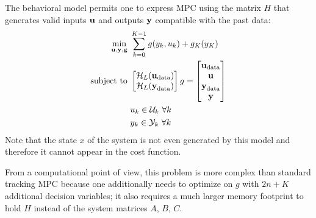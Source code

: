 The behavioral model permits one to express MPC using the matrix $H$ that generates valid inputs $\boldsymbol{\mathrm{u}}$ and outputs $\boldsymbol{\mathrm{y}}$ compatible with the past data:
\begin{equation*}
  \begin{aligned}
    \min_{\boldsymbol{\mathrm{u}}, \boldsymbol{\mathrm{y}},\boldsymbol{\mathrm{g}}}\ & \sum_{k=0}^{K-1} g(y_k,u_k) + g_K(y_K) \\
    \textrm{subject to } & \begin{bmatrix}
                             \mathcal{H}_L(\boldsymbol{\mathrm{u}}_\textrm{data}) \\ \mathcal{H}_L(\boldsymbol{\mathrm{y}}_\textrm{data})
                           \end{bmatrix} g =
                           \begin{bmatrix}
                             \boldsymbol{\mathrm{u}}_\textrm{data} \\ \boldsymbol{\mathrm{u}} \\ \boldsymbol{\mathrm{y}}_\textrm{data} \\ \boldsymbol{\mathrm{y}}
                           \end{bmatrix} \\
                           & u_k \in \mathcal{U}_k\ \forall k \\
                           & y_k \in \mathcal{Y}_k\ \forall k
  \end{aligned}
\end{equation*}
Note that the state $x$ of the system is not even generated by this model and therefore it cannot appear in the cost function.

From a computational point of view, this problem is more complex than standard tracking MPC because one additionally needs to optimize on $g$ with $2n+K$ additional decision variables; it also requires a much larger memory footprint to hold $H$ instead of the system matrices $A$, $B$, $C$.

